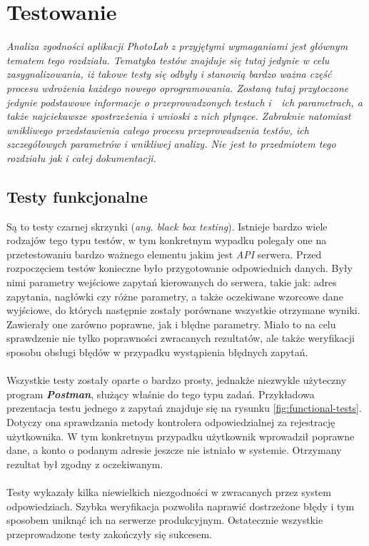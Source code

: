 \chapter{Testowanie}
{\em \quad Analiza zgodności aplikacji PhotoLab z przyjętymi wymaganiami jest głównym tematem tego rozdziału. Tematyka testów znajduje się tutaj jedynie w celu zasygnalizowania, iż takowe testy się odbyły i stanowią bardzo ważna część procesu wdrożenia każdego nowego oprogramowania. Zostaną tutaj przytoczone jedynie podstawowe informacje o przeprowadzonych testach i~~ich parametrach, a także najciekawsze spostrzeżenia i wnioski z nich płynące. Zabraknie natomiast wnikliwego przedstawienia całego procesu przeprowadzenia testów, ich szczegółowych parametrów i wnikliwej analizy. Nie jest to przedmiotem tego rozdziału jak i całej dokumentacji.}



\section{Testy funkcjonalne}
\quad Są to testy czarnej skrzynki (\textit{ang. black box testing}). Istnieje bardzo wiele rodzajów tego typu testów, w tym konkretnym wypadku polegały one na przetestowaniu bardzo ważnego elementu jakim jest \textit{API} serwera. Przed rozpoczęciem testów konieczne było przygotowanie odpowiednich danych. Były nimi parametry wejściowe zapytań kierowanych do serwera, takie jak: adres zapytania, nagłówki czy różne parametry, a także oczekiwane wzorcowe dane wyjściowe, do których następnie zostały porównane wszystkie otrzymane wyniki. Zawierały one zarówno poprawne, jak i błędne parametry. Miało to na celu sprawdzenie nie tylko poprawności zwracanych rezultatów, ale także weryfikacji sposobu obsługi błędów w przypadku wystąpienia błędnych zapytań. \\
\\
Wszystkie testy zostały oparte o bardzo prosty, jednakże niezwykle użyteczny program \textit{\textbf{Postman}}, służący właśnie do tego typu zadań. Przykładowa prezentacja testu jednego z zapytań znajduje się na  rysunku \ref{fig:functional-tests}. Dotyczy ona sprawdzania metody kontrolera odpowiedzialnej za rejestrację użytkownika. W tym konkretnym przypadku użytkownik wprowadził poprawne dane, a konto o podanym adresie jeszcze nie istniało w systemie. Otrzymany rezultat był zgodny z oczekiwanym.\\
\\
Testy wykazały kilka niewielkich niezgodności w zwracanych przez system odpowiedziach. Szybka weryfikacja pozwoliła naprawić dostrzeżone błędy i tym sposobem uniknąć ich na serwerze produkcyjnym. Ostatecznie wszystkie przeprowadzone testy zakończyły się sukcesem.

